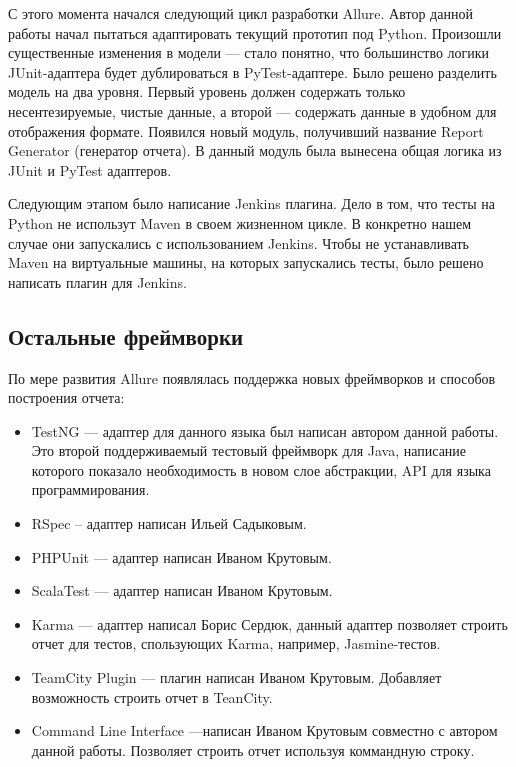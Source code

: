 С этого момента начался следующий цикл разработки Allure. Автор данной работы начал пытаться адаптировать текущий прототип под Python. Произошли существенные изменения в модели --- стало понятно, что большинство логики JUnit-адаптера будет дублироваться в PyTest-адаптере.
Было решено разделить модель на два уровня. Первый уровень должен содержать только несентезируемые, чистые данные, а второй --- содержать данные в удобном для отображения формате. Появился новый модуль, получивший название Report Generator (генератор отчета). 
В данный модуль была вынесена общая логика из JUnit и PyTest адаптеров.

Следующим этапом было написание Jenkins плагина. Дело в том, что тесты на Python не использут Maven в своем жизненном цикле. В конкретно нашем случае они запускались с использованием Jenkins. Чтобы не устанавливать Maven на виртуальные машины, на которых запускались тесты, было решено написать плагин для Jenkins. 

\subsection{Остальные фреймворки}

По мере развития Allure появлялась поддержка новых фреймворков и способов построения отчета:

\begin{itemize}
\item TestNG --- адаптер для данного языка был написан автором данной работы. Это второй поддерживаемый тестовый фреймворк для Java, написание которого показало необходимость в новом слое абстракции, API для языка программирования.
\item RSpec -- адаптер написан Ильей Садыковым.
\item PHPUnit --- адаптер написан Иваном Крутовым.
\item ScalaTest --- адаптер написан Иваном Крутовым.
\item Karma --- адаптер написал Борис Сердюк, данный адаптер позволяет строить отчет для тестов, спользующих Karma, например, Jasmine-тестов.
\item TeamCity Plugin --- плагин написан Иваном Крутовым. Добавляет возможность строить отчет в TeanCity.
\item Command Line Interface ---написан Иваном Крутовым совместно с автором данной работы. Позволяет строить отчет используя коммандную строку.
 
\end{itemize}

